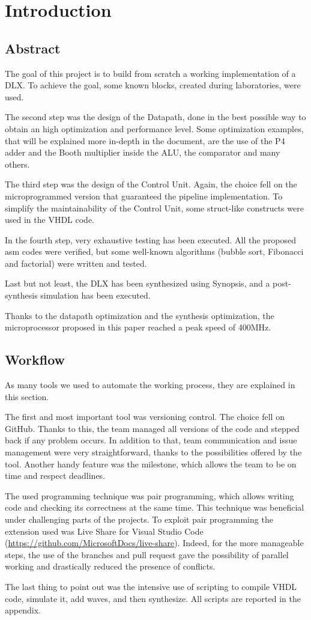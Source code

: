 \chapter{Introduction}

\section{Abstract}
The goal of this project is to build from scratch a working implementation of a DLX. To achieve the goal, some known blocks, created during laboratories, were used. 

The second step was the design of the Datapath, done in the best possible way to obtain an high optimization and performance level. Some optimization examples, that will be explained more in-depth in the document, are the use of the P4 adder and the Booth multiplier inside the ALU, the comparator and many others. 

The third step was the design of the Control Unit. Again, the choice fell on the microprogrammed version that guaranteed the pipeline implementation. To simplify the maintainability of the Control Unit, some struct-like constructs were used in the VHDL code. 

In the fourth step, very exhaustive testing has been executed. All the proposed asm codes were verified, but some well-known algorithms (bubble sort, Fibonacci and factorial) were written and tested.

Last but not least, the DLX has been synthesized using Synopsis, and a post-synthesis simulation has been executed. 

Thanks to the datapath optimization and the synthesis optimization, the microprocessor proposed in this paper reached a peak speed of 400MHz.  
\section{Workflow}
As many tools we used to automate the working process, they are explained in this section.

The first and most important tool was versioning control. The choice fell on GitHub. Thanks to this, the team managed all versions of the code and stepped back if any problem occurs. In addition to that, team communication and issue management were very straightforward, thanks to the possibilities offered by the tool. Another handy feature was the milestone, which allows the team to be on time and respect deadlines. 

The used programming technique was pair programming, which allows writing code and checking its correctness at the same time. This technique was beneficial under challenging parts of the projects. To exploit pair programming the extension used was Live Share for Visual Studio Code (\url{https://github.com/MicrosoftDocs/live-share}). Indeed, for the more manageable steps, the use of the branches and pull request gave the possibility of parallel working and drastically reduced the presence of conflicts. 

The last thing to point out was the intensive use of scripting to compile VHDL code, simulate it, add waves, and then synthesize. All scripts are reported in the appendix.